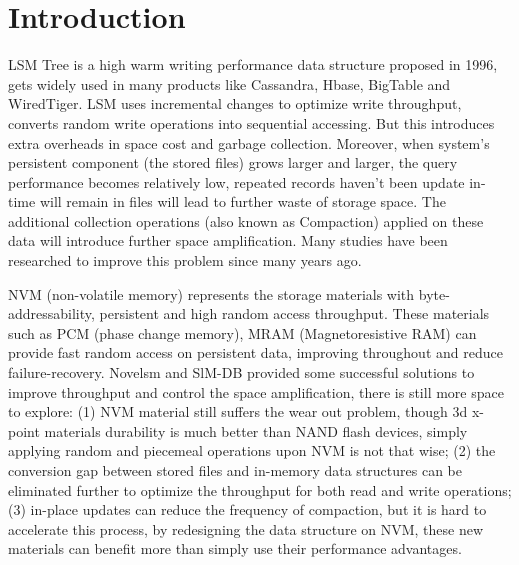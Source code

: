 \section{Introduction}

LSM Tree is a high warm writing performance data structure proposed in 1996\cite{o1996log}, gets widely used in many products like  Cassandra\cite{ApacheCa22:online}, Hbase\cite{ApacheHB26:online}, BigTable\cite{chang2008bigtable} and WiredTiger\cite{WiredTig38:online}. LSM uses incremental changes to optimize write throughput, converts random write operations into sequential accessing. But this introduces extra overheads in space cost and garbage collection. Moreover, when system's persistent component (the stored files) grows larger and larger, the query performance becomes relatively low, repeated records haven't been update in-time will remain in files will lead to further waste of storage space. The additional collection operations (also known as Compaction) applied on these data will introduce further space amplification. Many studies have been researched to improve this problem\cite{dayan2017monkey,dayan2018dostoevsky,kaiyrakhmet2019slm,kannan2018redesigning,raju2017pebblesdb,wu2015lsm,sears2012blsm} since many years ago.

NVM (non-volatile memory) represents the storage materials with byte-addressability, persistent and high random access throughput. These materials such as PCM (phase change memory), MRAM (Magnetoresistive RAM) can provide fast random access on persistent data, improving throughout and reduce failure-recovery. Novelsm\cite{kannan2018redesigning} and SlM-DB\cite{kaiyrakhmet2019slm} provided some successful solutions to improve throughput and control the space amplification, there is still more space to explore: (1) NVM material still suffers the wear out problem, though 3d x-point materials durability is much better than NAND flash devices, simply applying random and piecemeal operations upon NVM is not that wise; (2) the conversion gap between stored files and in-memory data structures can be eliminated further to optimize the throughput for both read and write operations; (3) in-place updates can reduce the frequency of compaction, but it is hard to accelerate this process, by redesigning the data structure on NVM, these new materials can benefit more than simply use their performance advantages.

